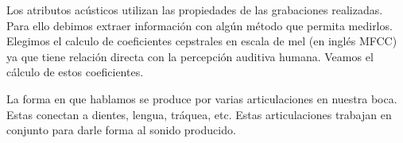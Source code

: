 Los atributos acústicos utilizan las propiedades de las grabaciones realizadas. Para ello debimos extraer información con algún método que permita medirlos. Elegimos el calculo de coeficientes cepstrales en escala de mel (en inglés MFCC) ya que tiene relación directa con la percepción auditiva humana. Veamos el cálculo de estos coeficientes.

La forma en que hablamos se produce por varias articulaciones en nuestra boca. Estas conectan a dientes, lengua, tráquea, etc. Estas articulaciones trabajan en conjunto para darle forma al sonido producido. 



\newcommand{\mfccvec}[3]%
{  
	\node[fill={rgb:black,1;white,2;white,3}, rounded corners, draw, inner sep=+0pt] at (#1,#2) {\tiny \begin{tabular}{c}
		Coef 1\\\hline
		Coef 2\\\hline
		Coef 3\\\hline
		...\\\hline
		Coef N\\
	\end{tabular}};
	\node at (#1, #2-1) {{\tiny #3}};
}

\newcommand{\mfccvecmax}[3]%
{  
	\node[fill={rgb:red,1;white,2;white,3}, rounded corners, draw, inner sep=+0pt] at (#1,#2) {\tiny \begin{tabular}{c}
		Max(T1.coef1, T2.coef1, ... , TM.coef1)\\\hline
		Max(T1.coef2, T2.coef2, ... , TM.coef2)\\\hline
		Max(T1.coef3, T2.coef3, ... , TM.coef3)\\\hline
		...\\\hline
		Max(T1.coefN, T2.coefN, ... , TM.coefN)\\
	\end{tabular}};
	\node at (#1, #2-1) {{\tiny #3}};
}

\newcommand{\intervalo}[2]%
{  
	\draw (#1,#2) -- (#1+0.8,#2);
	\draw (#1,#2-.1) -- (#1, #2+.1);
	\draw (#1+0.8,#2-.1) -- (#1+0.8, #2+.1);

	\draw (#1,#2) -- (#1+.1,#2+.05);
	\draw (#1,#2) -- (#1+.1,#2-.05);

	\draw (#1+0.8,#2) -- (#1+0.8-.1,#2+.05);
	\draw (#1+0.8,#2) -- (#1+0.8-.1,#2-.05);
}
	

